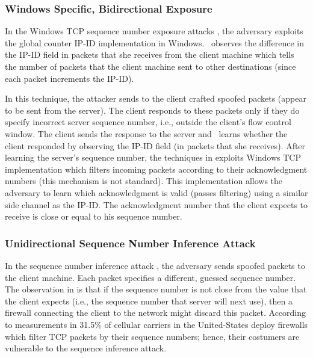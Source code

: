 \documentclass[conference]{IEEEtran}
\begin{document}
\subsubsection{Windows Specific, Bidirectional Exposure}

In the Windows TCP sequence number exposure attacks \cite{woottcp,lkm:phrack:07}, the adversary exploits the global counter IP-ID implementation in Windows. \mal\ observes the difference in the IP-ID field in packets that she receives from the client machine which tells the number of packets that the client machine sent to other destinations (since each packet increments the IP-ID).

In this technique, the attacker sends to the client crafted spoofed packets (appear to be sent from the server). The client responds to these packets only if they do specify incorrect server sequence number, i.e., outside the client's flow control window. The client sends the response to the server and \mal\ learns whether the client responded by observing the IP-ID field (in packets that she receives). After learning the server's sequence number, the techniques in \cite{woottcp,lkm:phrack:07} exploits Windows TCP implementation which filters incoming packets according to their acknowledgment numbers (this mechanism is not standard). This implementation allows the adversary to learn which acknowledgment is valid (passes filtering) using a similar side channel as the IP-ID. The acknowledgment number that the client expects to receive is close or equal to his sequence number.


\subsubsection{Unidirectional Sequence Number Inference Attack}
In the sequence number inference attack \cite{snptcp}, the adversary sends spoofed packets to the client machine. Each packet specifies a different, guessed sequence number. The observation in \cite{snptcp} is that if the sequence number is not close from the value that the client expects (i.e., the sequence number that server will next use), then a firewall connecting the client to the network might discard this packet. According to measurements in \cite{snptcp} 31.5\% of cellular carriers in the United-States deploy firewalls which filter TCP packets by their sequence numbers; hence, their costumers are vulnerable to the sequence inference attack.
\end{document}
